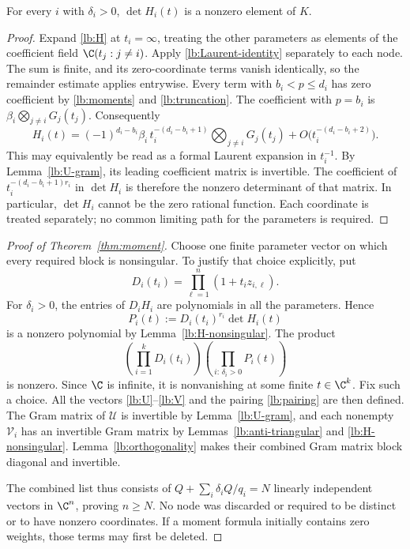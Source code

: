 \begin{lemma}
\label{lb:H-nonsingular}
For every \(i\) with \(\delta_i>0\), \(\det H_i(t)\) is a nonzero
element of \(K\).
\end{lemma}

\begin{proof}
Expand \eqref{lb:H} at \(t_i=\infty\), treating the other parameters
as elements of the coefficient field \(\C(t_j:j\neq i)\).
Apply \eqref{lb:Laurent-identity} separately to each node.  The sum is
finite, and its zero-coordinate terms vanish identically, so the
remainder estimate applies entrywise.  Every term with
\(b_i<p\leq d_i\) has zero coefficient by \eqref{lb:moments} and
\eqref{lb:truncation}.  The coefficient with \(p=b_i\) is
\(\beta_i\bigotimes_{j\neq i}G_j(t_j)\).  Consequently
\begin{equation}
  H_i(t)
   =(-1)^{d_i-b_i}\beta_i\,
       t_i^{-(d_i-b_i+1)}
          \bigotimes_{j\neq i}G_j(t_j)
      +O\bigl(t_i^{-(d_i-b_i+2)}\bigr).
  \label{lb:H-leading}
\end{equation}
This may equivalently be read as a formal Laurent expansion in
\(t_i^{-1}\).  By Lemma~\ref{lb:U-gram}, its leading coefficient
matrix is invertible.  The coefficient of
\(t_i^{-(d_i-b_i+1)r_i}\) in \(\det H_i\) is therefore the nonzero
determinant of that matrix.  In particular, \(\det H_i\) cannot be
the zero rational function.  Each coordinate is treated separately;
no common limiting path for the parameters is required.
\end{proof}

\begin{proof}[Proof of Theorem~\ref{thm:moment}]
Choose one finite parameter vector on which every required block is
nonsingular.  To justify that choice explicitly, put
\[
  D_i(t_i)=\prod_{\ell=1}^{n}(1+t_i z_{i,\ell}).
\]
For \(\delta_i>0\), the entries of \(D_iH_i\) are polynomials in
all the parameters.  Hence
\[
  P_i(t):=D_i(t_i)^{r_i}\det H_i(t)
\]
is a nonzero polynomial by Lemma~\ref{lb:H-nonsingular}.  The product
\[
  \left(\prod_{i=1}^{k}D_i(t_i)\right)
  \left(\prod_{i:\,\delta_i>0}P_i(t)\right)
\]
is nonzero.  Since \(\C\) is infinite, it is nonvanishing at some
finite \(t\in\C^k\).  Fix such a choice.  All the vectors
\eqref{lb:U}--\eqref{lb:V} and the pairing \eqref{lb:pairing} are
then defined.  The Gram matrix of \(\mathcal U\) is invertible by
Lemma~\ref{lb:U-gram}, and each nonempty \(\mathcal V_i\) has an
invertible Gram matrix by Lemmas~\ref{lb:anti-triangular} and
\ref{lb:H-nonsingular}.  Lemma~\ref{lb:orthogonality} makes their
combined Gram matrix block diagonal and invertible.

The combined list thus consists of
\(Q+\sum_i\delta_iQ/q_i=N\) linearly independent vectors in
\(\C^n\), proving \(n\geq N\).  No node was discarded or required
to be distinct or to have nonzero coordinates.  If a moment formula
initially contains zero weights, those terms may first be deleted.
\end{proof}
